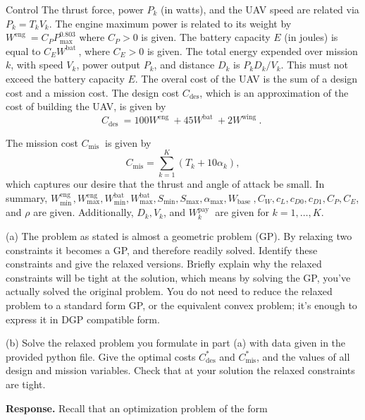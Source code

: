 \begin{chapter}{Control}
    The thrust force, power $P_k$ (in watts), and the UAV speed are related via $P_k=T_k V_k$. The engine maximum power is related to its weight by $W^{\text {eng }}=C_P P_{\max }^{0.803}$ where $C_P>0$ is given.
    The battery capacity $E$ (in joules) is equal to $C_E W^{\text {bat }}$, where $C_E>0$ is given. The total energy expended over mission $k$, with speed $V_k$, power output $P_k$, and distance $D_k$ is $P_k D_k / V_k$. This must not exceed the battery capacity $E$.
    The overal cost of the UAV is the sum of a design cost and a mission cost. The design cost $C_{\mathrm{des}}$, which is an approximation of the cost of building the UAV, is given by
    \[
    C_{\text {des }}=100 W^{\text {eng }}+45 W^{\text {bat }}+2 W^{\text {wing }} \text {. }
    \]

    \noindent The mission cost $C_{\text {mis }}$ is given by
    \[
    C_{\mathrm{mis}}=\sum_{k=1}^K\left(T_k+10 \alpha_k\right),
    \]
    which captures our desire that the thrust and angle of attack be small.
    In summary, $W_{\min }^{\text {eng }}, W_{\max }^{\mathrm{eng}}, W_{\min }^{\mathrm{bat}}, W_{\max }^{\mathrm{bat}}, S_{\min }, S_{\max }, \alpha_{\max }, W_{\text {base }}, C_W, c_L, c_{D 0}, c_{D 1}, C_P, C_E$, and $\rho$ are given. Additionally, $D_k, V_k$, and $W_k^{\text {pay }}$ are given for $k=1, \ldots, K$.
    
    \vspace{0.1cm}
    \noindent(a) The problem as stated is almost a geometric problem (GP). By relaxing two constraints it becomes a GP,
    and therefore readily solved.
    Identify these constraints and give the relaxed versions. Briefly explain why the relaxed constraints will be tight at the solution,
    which means by solving the GP, you've actually solved the original problem.
    You do not need to reduce the relaxed problem to a standard form GP, or the equivalent convex problem; it's enough to express it in DGP compatible form.
    
    \vspace{0.1cm}
    \noindent(b) Solve the relaxed problem you formulate in part (a) with data given in the provided python file.
    Give the optimal costs $C_{\text{des}}^{*}$ and $C_{\text{mis}}^{*}$, and the values of all design and mission variables. 
    Check that at your solution the relaxed constraints are tight.
    
    \vspace{0.1cm}
    \noindent \textbf{Response.}
    Recall that an optimization problem of the form
    

\end{chapter}

